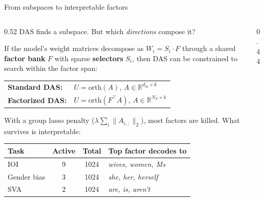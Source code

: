 \documentclass[aspectratio=169,11pt]{beamer}
\newcommand{\R}{\mathbb{R}}
\begin{document}
\hypertarget{sec12b}{}
\begin{frame}{From subspaces to interpretable factors}
\vspace{-0.3em}
\begin{columns}[T]
\begin{column}{0.52\textwidth}
{\small DAS finds a subspace. But which \emph{directions} compose it?}

\vspace{0.2em}
{\small If the model's weight matrices decompose as $W_i = S_i \cdot F$ through a shared \textbf{factor bank} $F$ with sparse \textbf{selectors} $S_i$, then DAS can be constrained to search within the factor span:}

\vspace{0.2em}
\begin{tabular}{@{}l@{~}l@{}}
\textbf{\small Standard DAS:} & {\small $U = \mathrm{orth}(A)$, $A \in \R^{d_m \times k}$}\\
\textbf{\small Factorized DAS:} & {\small $U = \mathrm{orth}(F^\top A)$, $A \in \R^{N_F \times k}$}\\
\end{tabular}

\vspace{0.2em}
{\small With a group lasso penalty ($\lambda \sum_i \|A_{i,:}\|_2$), most factors are killed. What survives is interpretable:}

\vspace{0.2em}
{\small\setlength{\tabcolsep}{3pt}
\begin{tabular}{lccl}
\toprule
\textbf{Task} & \textbf{Active} & \textbf{Total} & \textbf{Top factor decodes to} \\
\midrule
IOI & 9 & 1024 & \emph{wives, women, Ms} \\
Gender bias & 3 & 1024 & \emph{she, her, herself} \\
SVA & 2 & 1024 & \emph{are, is, aren't} \\
\bottomrule
\end{tabular}}
\end{column}
\begin{column}{0.44\textwidth}
\end{column}
\end{columns}
\end{frame}
\end{document}
